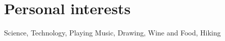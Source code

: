 \ifextended%
  \section{Personal interests}

  Science, Technology, Playing Music, Drawing, Wine and Food, Hiking
\fi
